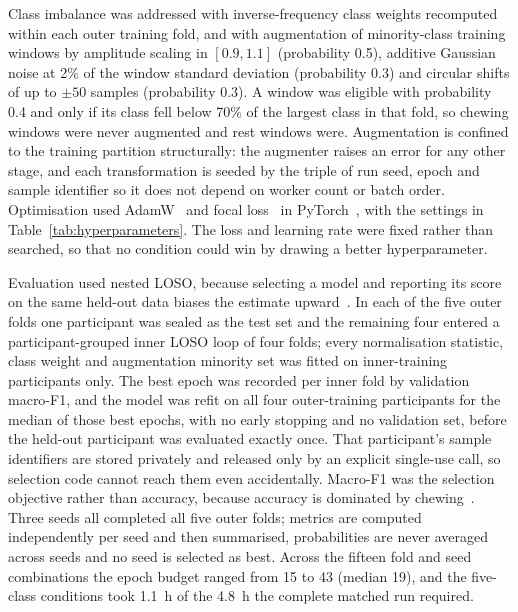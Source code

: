 \documentclass[pdflatex,sn-nature,iicol]{sn-jnl}
\begin{document}
Class imbalance was addressed with inverse-frequency class weights recomputed within each outer training fold, and with augmentation of minority-class training windows by amplitude scaling in $[0.9, 1.1]$ (probability 0.5), additive Gaussian noise at 2\% of the window standard deviation (probability 0.3) and circular shifts of up to $\pm50$ samples (probability 0.3). A window was eligible with probability 0.4 and only if its class fell below 70\% of the largest class in that fold, so chewing windows were never augmented and rest windows were. Augmentation is confined to the training partition structurally: the augmenter raises an error for any other stage, and each transformation is seeded by the triple of run seed, epoch and sample identifier so it does not depend on worker count or batch order. Optimisation used AdamW~\cite{loshchilov2019decoupled} and focal loss~\cite{lin2017focal} in PyTorch~\cite{paszke2019pytorch}, with the settings in Table~\ref{tab:hyperparameters}. The loss and learning rate were fixed rather than searched, so that no condition could win by drawing a better hyperparameter.

Evaluation used nested LOSO, because selecting a model and reporting its score on the same held-out data biases the estimate upward~\cite{cawley2010overfitting,varma2006bias}. In each of the five outer folds one participant was sealed as the test set and the remaining four entered a participant-grouped inner LOSO loop of four folds; every normalisation statistic, class weight and augmentation minority set was fitted on inner-training participants only. The best epoch was recorded per inner fold by validation macro-F1, and the model was refit on all four outer-training participants for the median of those best epochs, with no early stopping and no validation set, before the held-out participant was evaluated exactly once. That participant's sample identifiers are stored privately and released only by an explicit single-use call, so selection code cannot reach them even accidentally. Macro-F1 was the selection objective rather than accuracy, because accuracy is dominated by chewing~\cite{chicco2020advantages}. Three seeds all completed all five outer folds; metrics are computed independently per seed and then summarised, probabilities are never averaged across seeds and no seed is selected as best. Across the fifteen fold and seed combinations the epoch budget ranged from 15 to 43 (median 19), and the five-class conditions took 1.1~h of the 4.8~h the complete matched run required.
\end{document}
